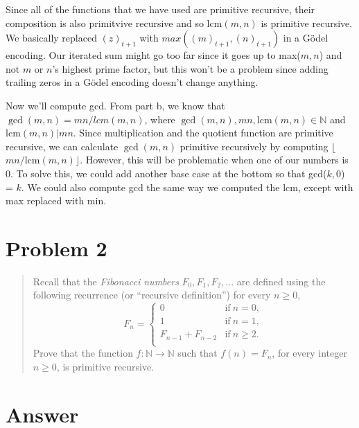 \documentclass{article}
\newcommand{\nat}{\mathbb{N}}
\newcommand{\lcm}{\mathrm{lcm}}
\begin{document}
\begin{enumerate}[label=\alph*)]
  Since all of the functions that we have used are primitive
  recursive, their composition is also primitvive recursive and so
  $\lcm(m,n)$ is primitive recursive. We basically replaced
  $(z)_{t+1}$ with $max((m)_{t+1},(n)_{t+1})$ in a G\"odel encoding.
  Our iterated sum might go too far since it goes up to max($m,n$) and
  not $m$ or $n$'s highest prime factor, but this won't be a problem
  since adding trailing zeros in a G\"odel encoding doesn't change
  anything.

  Now we'll compute gcd. From part b, we know that $\gcd(m,n) =
  mn/lcm(m,n)$, where $\gcd(m,n), mn, \lcm(m,n) \in \nat$ and
  $\lcm(m,n) | mn$. Since multiplication and the quotient function are
  primitive recursive, we can calculate $\gcd(m,n)$ primitive
  recursively by computing $\lfloor$ $mn / \lcm(m,n) \rfloor$.
  However, this will be problematic when one of our numbers is 0. To
  solve this, we could add another base case at the bottom so that
  gcd($k,0$) = $k$. We could also compute gcd the same way we computed
  the lcm, except with max replaced with min.

\end{enumerate}

\section*{Problem 2}

\begin{quote}
  Recall that the \textit{Fibonacci numbers} $F_0, F_1, F_2, ...$ are
  defined using the following recurrence (or ``recursive definition'')
  for every $n \ge 0$,
  \begin{displaymath}
    F_n = \left\{
      \begin{array}{lr}
        0 & \mathrm{if}\ n = 0, \\ 1 & \mathrm{if}\ n = 1, \\ F_{n-1}
        + F_{n-2} & \mathrm{if}\ n \ge 2. \\
      \end{array}
    \right.
  \end{displaymath}
  Prove that the function $f : \nat \to \nat$ such that $f(n) = F_n$,
  for every integer $n \ge 0$, is primitive recursive.
\end{quote}

\section*{Answer}
\end{document}
